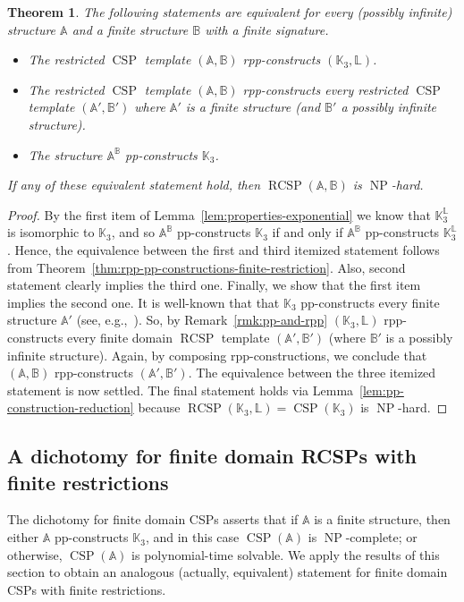 \documentclass{article}
\newtheorem{theorem}{Theorem}
\theoremstyle{definition}
\theoremstyle{remark}
\DeclareMathOperator{\NP}{NP}
\DeclareMathOperator{\CSP}{CSP}
\DeclareMathOperator{\RCSP}{RCSP}
\newcommand{\bA}{{\mathbb A}}
\newcommand{\bB}{{\mathbb B}}
\newcommand{\bK}{{\mathbb K}}
\newcommand{\bL}{{\mathbb L}}
\begin{document}
\begin{theorem}\label{thm:rpp-construction-K3}
    The following statements are equivalent for every (possibly infinite) structure $\bA$
    and a finite structure $\bB$ with a finite signature. 
    \begin{itemize}
        \item The restricted $\CSP$ template $(\bA,\bB)$ rpp-constructs $(\bK_3,\bL)$.
        \item The restricted $\CSP$ template $(\bA,\bB)$ rpp-constructs every restricted
        $\CSP$ template $(\bA',\bB')$ where $\bA'$ is a finite structure (and $\bB'$ a possibly infinite structure).
        \item The structure $\bA^\bB$ pp-constructs $\bK_3$. 
    \end{itemize}
    If any of these equivalent statement hold, then $\RCSP(\bA,\bB)$ is $\NP$-hard.
\end{theorem}
\begin{proof}
    By the first item of Lemma~\ref{lem:properties-exponential} we know that
    $\bK_3^\bL$ is isomorphic to $\bK_3$, and so $\bA^\bB$ pp-constructs $\bK_3$
    if and only if $\bA^\bB$ pp-constructs $\bK_3^\bL$. Hence, the equivalence between
    the first and third itemized statement follows from Theorem~\ref{thm:rpp-pp-constructions-finite-restriction}.
    Also, second statement clearly implies the third one. 
    Finally, we show that the first item implies the second one. It is well-known that 
    that $\bK_3$ pp-constructs every finite structure $\bA'$ (see, e.g.,~\cite[Corollary 3.2.1]{Book}).
    So, by Remark~\ref{rmk:pp-and-rpp}
    $(\bK_3,\bL)$ rpp-constructs every finite domain $\RCSP$ template $(\bA',\bB')$
    (where $\bB'$ is a possibly infinite structure). Again, by composing rpp-constructions,
    we conclude that $(\bA,\bB)$ rpp-constructs $(\bA',\bB')$. The equivalence between the three
    itemized statement is now settled. The final statement holds via Lemma~\ref{lem:pp-construction-reduction}
    because $\RCSP(\bK_3,\bL) = \CSP(\bK_3)$ is $\NP$-hard. 
\end{proof}

\subsection{A dichotomy for finite domain RCSPs with finite restrictions}

The dichotomy for finite domain CSPs asserts that if $\bA$ is a finite structure, then
either $\bA$ pp-constructs $\bK_3$, and in this case $\CSP(\bA)$ is $\NP$-complete; or otherwise,
$\CSP(\bA)$ is polynomial-time solvable. We apply the results of this section to obtain an
analogous (actually, equivalent) statement for finite domain CSPs with finite restrictions. 
\end{document}
